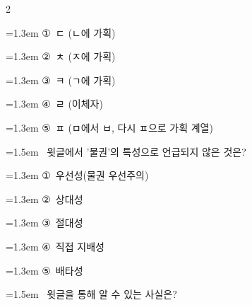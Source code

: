 \documentclass[10pt, a4paper]{article}
\begin{document}
\begin{multicols}{2}
\begin{minipage}{\columnwidth}
\vspace{0.5mm}
{\hangindent=1.3em  \noindent\hspace{0.3em}①~ㄷ (ㄴ에 가획)\par}
{\hangindent=1.3em  \noindent\hspace{0.3em}②~ㅊ (ㅈ에 가획)\par}
{\hangindent=1.3em  \noindent\hspace{0.3em}③~ㅋ (ㄱ에 가획)\par}
{\hangindent=1.3em  \noindent\hspace{0.3em}④~ㄹ (이체자)\par}
{\hangindent=1.3em  \noindent\hspace{0.3em}⑤~ㅍ (ㅁ에서 ㅂ, 다시 ㅍ으로 가획 계열)\par}
\vspace{4mm}
\end{minipage}
\par

\noindent\begin{minipage}{\columnwidth}
\vspace{2mm}
{\hangindent=1.5em  ~윗글에서 '물권'의 특성으로 언급되지 않은 것은?\par}

\vspace{0.5mm}
{\hangindent=1.3em  \noindent\hspace{0.3em}①~우선성(물권 우선주의)\par}
{\hangindent=1.3em  \noindent\hspace{0.3em}②~상대성\par}
{\hangindent=1.3em  \noindent\hspace{0.3em}③~절대성\par}
{\hangindent=1.3em  \noindent\hspace{0.3em}④~직접 지배성\par}
{\hangindent=1.3em  \noindent\hspace{0.3em}⑤~배타성\par}
\vspace{4mm}
\end{minipage}
\par

\noindent\begin{minipage}{\columnwidth}
\vspace{2mm}
{\hangindent=1.5em  ~윗글을 통해 알 수 있는 사실은?\par}


\end{minipage}
\end{multicols}
\end{document}
